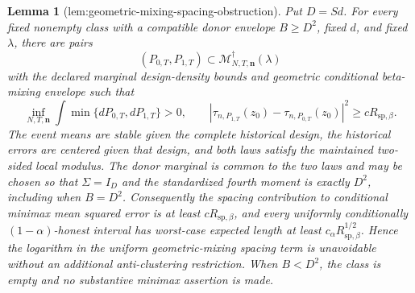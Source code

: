 \documentclass{article}
\newtheorem{lemma}{Lemma}
\begin{document}
\begin{lemma}[lem:geometric-mixing-spacing-obstruction]\label{lem:geometric-mixing-spacing-obstruction}
Put \(D=Sd\).  For every fixed nonempty class with a compatible donor envelope \(B\ge D^2\), fixed \(d\), and fixed \(\lambda\), there are pairs
\[
(P_{0,T},P_{1,T})\subset
\mathcal M_{N,T,\mathbf n}^{\dagger}(\lambda)
\]
with the declared marginal design-density bounds and geometric conditional beta-mixing envelope such that
\[
\inf_{N,T,\mathbf n}\int\min\{dP_{0,T},dP_{1,T}\}>0,
\qquad
|\tau_{n,P_{1,T}}(z_0)-\tau_{n,P_{0,T}}(z_0)|^2
\ge cR_{\mathrm{sp},\beta}.
\]
The event means are stable given the complete historical design, the historical errors are centered given that design, and both laws satisfy the maintained two-sided local modulus.  The donor marginal is common to the two laws and may be chosen so that \(\Sigma=I_D\) and the standardized fourth moment is exactly \(D^2\), including when \(B=D^2\).  Consequently the spacing contribution to conditional minimax mean squared error is at least \(cR_{\mathrm{sp},\beta}\), and every uniformly conditionally \((1-\alpha)\)-honest interval has worst-case expected length at least \(c_\alpha R_{\mathrm{sp},\beta}^{1/2}\).  Hence the logarithm in the uniform geometric-mixing spacing term is unavoidable without an additional anti-clustering restriction.  When \(B<D^2\), the class is empty and no substantive minimax assertion is made.
\end{lemma}
\end{document}
